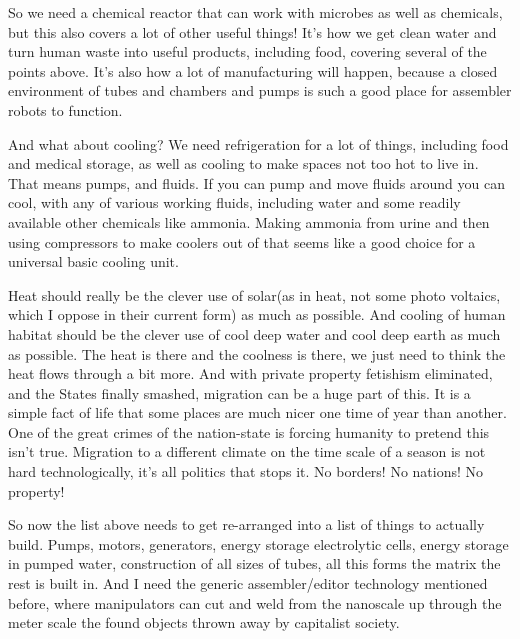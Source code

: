 So we need a chemical reactor that can work with microbes as well as
chemicals, but this also covers a lot of other useful things! It's how
we get clean water and turn human waste into useful products, including
food, covering several of the points above. It's also how a lot of
manufacturing will happen, because a closed environment of tubes and
chambers and pumps is such a good place for assembler robots to
function.

And what about cooling? We need refrigeration for a lot of things,
including food and medical storage, as well as cooling to make spaces
not too hot to live in. That means pumps, and fluids. If you can pump
and move fluids around you can cool, with any of various working fluids,
including water and some readily available other chemicals like ammonia.
Making ammonia from urine and then using compressors to make coolers out
of that seems like a good choice for a universal basic cooling unit.

Heat should really be the clever use of solar(as in heat, not some photo
voltaics, which I oppose in their current form) as much as possible. And
cooling of human habitat should be the clever use of cool deep water and
cool deep earth as much as possible. The heat is there and the coolness
is there, we just need to think the heat flows through a bit more. And
with private property fetishism eliminated, and the States finally
smashed, migration can be a huge part of this. It is a simple fact of
life that some places are much nicer one time of year than another. One
of the great crimes of the nation-state is forcing humanity to pretend
this isn't true. Migration to a different climate on the time scale of a
season is not hard technologically, it's all politics that stops it. No
borders! No nations! No property!

So now the list above needs to get re-arranged into a list of things to
actually build. Pumps, motors, generators, energy storage electrolytic
cells, energy storage in pumped water, construction of all sizes of
tubes, all this forms the matrix the rest is built in. And I need the
generic assembler/editor technology mentioned before, where manipulators
can cut and weld from the nanoscale up through the meter scale the found
objects thrown away by capitalist society.

